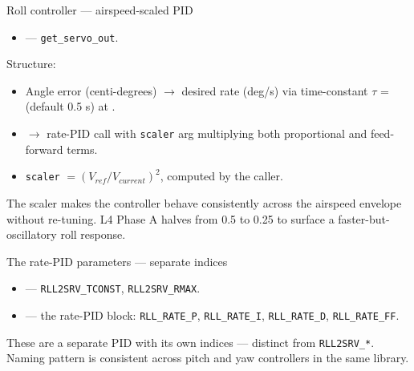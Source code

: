 \documentclass[aspectratio=169,11pt]{beamer}
\begin{document}
\begin{frame}{Roll controller --- airspeed-scaled PID}
  \begin{itemize}
    \item {} --- \texttt{get\_servo\_out}.
  \end{itemize}
  \vfill
  Structure:
  \begin{itemize}
    \item Angle error (centi-degrees) $\rightarrow$ desired rate (deg/s) via time-constant $\tau$ =  (default 0.5 s) at .
    \item $\rightarrow$ rate-PID call with \texttt{scaler} arg multiplying both proportional and feed-forward terms.
    \item \texttt{scaler} $= (V_{ref} / V_{current})^2$, computed by the caller.
  \end{itemize}
  \vfill
  The scaler makes the controller behave consistently across the airspeed envelope without re-tuning.
  \vfill
  L4 Phase A halves  from 0.5 to 0.25 to surface a faster-but-oscillatory roll response.
\end{frame}

\begin{frame}{The rate-PID parameters --- separate indices}
  \begin{itemize}
    \item {} --- \texttt{RLL2SRV\_TCONST}, \texttt{RLL2SRV\_RMAX}.
    \item {} --- the rate-PID block: \texttt{RLL\_RATE\_P}, \texttt{RLL\_RATE\_I}, \texttt{RLL\_RATE\_D}, \texttt{RLL\_RATE\_FF}.
  \end{itemize}
  \vfill
  These are a separate PID with its own indices --- distinct from \texttt{RLL2SRV\_*}.
  \vfill
  Naming pattern is consistent across pitch and yaw controllers in the same library.
\end{frame}
\end{document}
